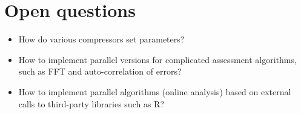 \section{Open questions}

\begin{itemize}
\item
How do various compressors set parameters?

\item
How to implement parallel versions for complicated assessment algorithms, such as FFT and auto-correlation of errors?

\item 
How to implement parallel algorithms (online analysis) based on external calls to third-party libraries such as R? 
\end{itemize}

